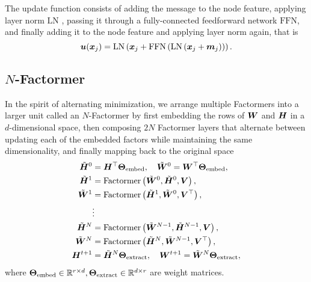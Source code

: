\documentclass{article}
\begin{document}
The update function consists of adding the message to the node feature, applying layer norm $\text{LN}$ \citep{Ba2016}, passing it through a fully-connected feedforward network $\text{FFN}$, and finally adding it to the node feature and applying layer norm again, that is
\begin{equation}
    {\bm{u}}({\bm{x}}_j) = \text{LN}\left({\bm{x}}_j+\text{FFN}\left(\text{LN}\left({\bm{x}}_j + {\bm{m}}_j\right)\right)\right).
\end{equation}
 
\subsection{$N$-Factormer}
In the spirit of alternating minimization, we arrange multiple Factormers into a larger unit called an $N$-Factormer by first embedding the rows of ${\bm{W}}$ and ${\bm{H}}$ in a $d$-dimensional space, then composing $2N$ Factormer layers that alternate between updating each of the embedded factors while maintaining the same dimensionality, and finally mapping back to the original space 
\begin{equation}
    \begin{aligned}
        \tilde{{\bm{H}}}^0 &= {\bm{H}}^\top  {\bm{\Theta}}_\text{embed}, \quad \tilde{{\bm{W}}}^0 = {\bm{W}}^\top  {\bm{\Theta}}_\text{embed}, \\
        \tilde{{\bm{H}}}^1 &= \text{Factormer}\left(\tilde{{\bm{W}}}^0, \tilde{{\bm{H}}}^0,  {\bm{V}}\right), \\
        \tilde{{\bm{W}}}^1 &= \text{Factormer}\left(\tilde{{\bm{H}}}^1, \tilde{{\bm{W}}}^0,  {\bm{V}}^\top  \right), \\
        & \vdots \\
        \tilde{{\bm{H}}}^N &= \text{Factormer}\left(\tilde{{\bm{W}}}^{N-1}, \tilde{{\bm{H}}}^{N-1},  {\bm{V}}\right), \\
        \tilde{{\bm{W}}}^N &= \text{Factormer}\left(\tilde{{\bm{H}}}^N, \tilde{{\bm{W}}}^{N-1},  {\bm{V}}^\top  \right), \\
        {\bm{H}}^{t+1} &= \tilde{{\bm{H}}}^N{\bm{\Theta}}_\text{extract}, \quad {\bm{W}}^{t+1} = \tilde{{\bm{W}}}^N{\bm{\Theta}}_\text{extract}, 
    \end{aligned}
\end{equation}
where ${\bm{\Theta}}_\text{embed}\in\mathbb{R}^{r\times d}, {\bm{\Theta}}_\text{extract} \in\mathbb{R}^{d\times r}$ are weight matrices.
\end{document}
